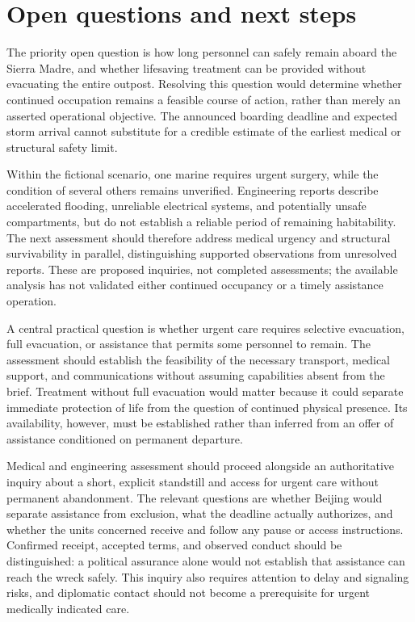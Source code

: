 \documentclass[11pt]{article}
\begin{document}
\section{Open questions and next steps}
The priority open question is how long personnel can safely remain aboard the Sierra Madre, and whether lifesaving treatment can be provided without evacuating the entire outpost. Resolving this question would determine whether continued occupation remains a feasible course of action, rather than merely an asserted operational objective. The announced boarding deadline and expected storm arrival cannot substitute for a credible estimate of the earliest medical or structural safety limit.

Within the fictional scenario, one marine requires urgent surgery, while the condition of several others remains unverified. Engineering reports describe accelerated flooding, unreliable electrical systems, and potentially unsafe compartments, but do not establish a reliable period of remaining habitability. The next assessment should therefore address medical urgency and structural survivability in parallel, distinguishing supported observations from unresolved reports. These are proposed inquiries, not completed assessments; the available analysis has not validated either continued occupancy or a timely assistance operation.

A central practical question is whether urgent care requires selective evacuation, full evacuation, or assistance that permits some personnel to remain. The assessment should establish the feasibility of the necessary transport, medical support, and communications without assuming capabilities absent from the brief. Treatment without full evacuation would matter because it could separate immediate protection of life from the question of continued physical presence. Its availability, however, must be established rather than inferred from an offer of assistance conditioned on permanent departure.

Medical and engineering assessment should proceed alongside an authoritative inquiry about a short, explicit standstill and access for urgent care without permanent abandonment. The relevant questions are whether Beijing would separate assistance from exclusion, what the deadline actually authorizes, and whether the units concerned receive and follow any pause or access instructions. Confirmed receipt, accepted terms, and observed conduct should be distinguished: a political assurance alone would not establish that assistance can reach the wreck safely. This inquiry also requires attention to delay and signaling risks, and diplomatic contact should not become a prerequisite for urgent medically indicated care.
\end{document}
